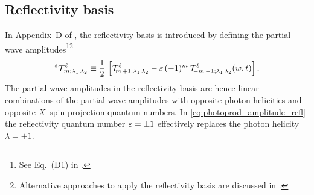\subsection{Reflectivity basis}%
\label{sec:photoprod:reflectivity}

In Appendix~D of , the reflectivity basis is
introduced by defining the partial-wave amplitudes\footnote{See
Eq.~(D1) in .}\footnote{Alternative
approaches to apply the reflectivity basis are discussed in
.}
\begin{equation}
  \label{eq:photoprod_amplitude_refl}
  \prescript{\refl}{}{\mathcal{T}}^\ell_{\!m; \lambda_1\, \lambda_2}
  \equiv \frac{1}{2}\, \sBrk{\mathcal{T}^\ell_{\!m\, {+1}; \lambda_1\, \lambda_2}
  - \refl\, (-1)^m\, \mathcal{T}^\ell_{\!{-m}\, {-1}; \lambda_1\, \lambda_2}(w, t)}.
\end{equation}
The partial-wave amplitudes in the reflectivity basis are hence linear
combinations of the partial-wave amplitudes with opposite photon
helicities and opposite $X$~spin projection quantum numbers.  In
\cref{eq:photoprod_amplitude_refl} the reflectivity quantum number
$\varepsilon = \pm 1$ effectively replaces the photon helicity $\lambda =
\pm 1$.

